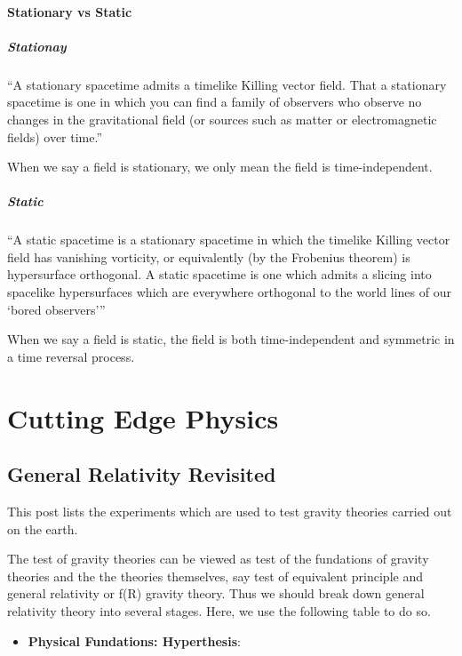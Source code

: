 \documentclass[letterpaper,10pt,english]{sphinxmanual}
\begin{document}
\subsubsection{Stationary vs Static}
\label{relativity/GeneralRelativity:stationary-vs-static}

\paragraph{Stationay}
\label{relativity/GeneralRelativity:stationay}
``A stationary spacetime admits a timelike Killing vector field. That a stationary spacetime is one in which you can find a family of observers who observe no changes in the gravitational field (or sources such as matter or electromagnetic fields) over time.''

When we say a field is stationary, we only mean the field is time-independent.


\paragraph{Static}
\label{relativity/GeneralRelativity:static}
``A static spacetime is a stationary spacetime in which the timelike Killing vector field has vanishing vorticity, or equivalently (by the Frobenius theorem) is hypersurface orthogonal. A static spacetime is one which admits a slicing into spacelike hypersurfaces which are everywhere orthogonal to the world lines of our `bored observers'''

When we say a field is static, the field is both time-independent and symmetric in a time reversal process.


\chapter{Cutting Edge Physics}
\label{index:cutting-edge-physics}

\section{General Relativity Revisited}
\label{relativity/GeneralRelativityAdv:general-relativity-revisited}\label{relativity/GeneralRelativityAdv::doc}
This post lists the experiments which are used to test gravity theories
carried out on the earth.

The test of gravity theories can be viewed as test of the fundations of
gravity theories and the the theories themselves, say test of equivalent
principle and general relativity or f(R) gravity theory. Thus we should
break down general relativity theory into several stages. Here, we use
the following table to do so.
\begin{itemize}
\item {} 
\textbf{Physical Fundations: Hyperthesis}:

\end{itemize}
\end{document}
